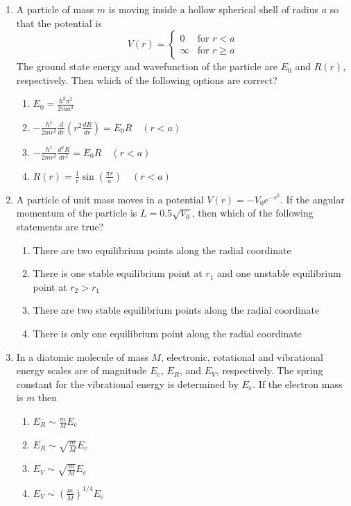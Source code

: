 \documentclass[journal,12pt,onecolumn]{IEEEtran}
\theoremstyle{remark}
\begin{document}
\begin{enumerate}
    \item A particle of mass $ m $ is moving inside a hollow spherical shell of radius $ a $ so that the potential is
    \[
    V(r) = 
    \begin{cases} 
      0 & \text{for } r < a \\
      \infty & \text{for } r \geq a 
    \end{cases}
    \]
    The ground state energy and wavefunction of the particle are $ E_0 $ and $ R(r) $, respectively. Then which of the following options are correct?
    \begin{enumerate}
        \item $ E_0 = \frac{\hbar^2 \pi^2}{2 m a^2} $
        \item $ -\frac{\hbar^2}{2 m r^2} \frac{d}{dr} \left( r^2 \frac{d R}{dr} \right) = E_0 R \quad (r < a) $
        \item $ -\frac{\hbar^2}{2 m r^2} \frac{d^2 R}{dr^2} = E_0 R \quad (r < a) $
        \item $ R(r) = \frac{1}{r} \sin \left( \frac{\pi r}{a} \right) \quad (r < a) $
    \end{enumerate}

    \item A particle of unit mass moves in a potential $ V(r) = -V_0 e^{-r^2} $. If the angular momentum of the particle is $ L = 0.5 \sqrt{V_0} $, then which of the following statements are true?
    \begin{enumerate}
        \item There are two equilibrium points along the radial coordinate
        \item There is one stable equilibrium point at $ r_1 $ and one unstable equilibrium point at $ r_2 > r_1 $
        \item There are two stable equilibrium points along the radial coordinate
        \item There is only one equilibrium point along the radial coordinate
    \end{enumerate}
    \item In a diatomic molecule of mass $ M $, electronic, rotational and vibrational energy scales are of magnitude $ E_e $, $ E_R $, and $ E_V $, respectively. The spring constant for the vibrational energy is determined by $ E_e $. If the electron mass is $ m $ then
    \begin{enumerate}
        \item $ E_R \sim \frac{m}{M} E_e $
        \item $ E_R \sim \sqrt{\frac{m}{M}} E_e $
        \item $ E_V \sim \sqrt{\frac{m}{M}} E_e $
        \item $ E_V \sim \left( \frac{m}{M} \right)^{1/4} E_e $
    \end{enumerate}


\end{enumerate}
\end{document}
